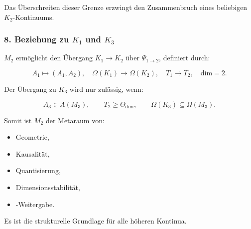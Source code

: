 Das Überschreiten dieser Grenze erzwingt den Zusammenbruch eines beliebigen $K_2$-Kontinuums.

\subsubsection*{8. Beziehung zu \texorpdfstring{$K_1$}{K_1} und \texorpdfstring{$K_3$}{K_3}}

$M_2$ ermöglicht den Übergang $K_1 \to K_2$ über $\Psi_{1\to2}$, definiert durch:

\[
A_1 \mapsto (A_1, A_2),\quad
\Omega(K_1) \to \Omega(K_2),\quad
T_1 \to T_2,\quad
\text{dim} = 2.
\]

Der Übergang zu $K_3$ wird nur zulässig, wenn:

\[
A_3 \in A(M_3),\qquad
T_2 \ge \Theta_{\text{dim}},
\qquad
\Omega(K_3) \subseteq \Omega(M_3).
\]

Somit ist $M_2$ der Metaraum von:

\begin{itemize}
    \item Geometrie,
    \item Kausalität,
    \item Quantisierung,
    \item Dimensionsstabilität,
    \item-Weitergabe.
\end{itemize}

Es ist die strukturelle Grundlage für alle höheren Kontinua.

